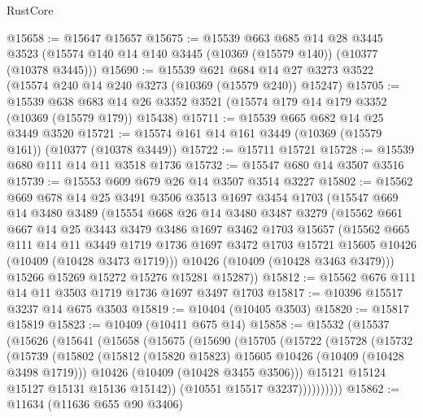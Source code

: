 \begin{lexlean}{RustCore}
\begin{coremodule}
@15658 := @15647 @15657
@15675 := @15539
    @663
    @685
    @14
    @28
    @3445
    @3523
    (@15574 @140 @14 @140 @3445 (@10369 (@15579 @140)) (@10377 (@10378 @3445)))
@15690 := @15539
    @621
    @684
    @14
    @27
    @3273
    @3522
    (@15574 @240 @14 @240 @3273 (@10369 (@15579 @240)) @15247)
@15705 := @15539
    @638
    @683
    @14
    @26
    @3352
    @3521
    (@15574 @179 @14 @179 @3352 (@10369 (@15579 @179)) @15438)
@15711 := @15539 @665 @682 @14 @25 @3449 @3520
@15721 := @15574 @161 @14 @161 @3449 (@10369 (@15579 @161)) (@10377 (@10378 @3449))
@15722 := @15711 @15721
@15728 := @15539 @680 @111 @14 @11 @3518 @1736
@15732 := @15547 @680 @14 @3507 @3516
@15739 := @15553 @609 @679 @26 @14 @3507 @3514 @3227
@15802 := @15562
    @669
    @678
    @14
    @25
    @3491
    @3506
    @3513
    @1697
    @3454
    @1703
    (@15547
      @669
      @14
      @3480
      @3489
      (@15554
        @668
        @26
        @14
        @3480
        @3487
        @3279
        (@15562
          @661
          @667
          @14
          @25
          @3443
          @3479
          @3486
          @1697
          @3462
          @1703
          @15657
          (@15562
            @665
            @111
            @14
            @11
            @3449
            @1719
            @1736
            @1697
            @3472
            @1703
            @15721
            @15605
            @10426
            (@10409 (@10428 @3473 @1719)))
          @10426
          (@10409 (@10428 @3463 @3479)))
        @15266
        @15269
        @15272
        @15276
        @15281
        @15287))
@15812 := @15562 @676 @111 @14 @11 @3503 @1719 @1736 @1697 @3497 @1703
@15817 := @10396 @15517 @3237 @14 @675 @3503
@15819 := @10404 (@10405 @3503)
@15820 := @15817 @15819
@15823 := @10409 (@10411 @675 @14)
@15858 := @15532
    (@15537
      (@15626
        (@15641
          (@15658
            (@15675
              (@15690
                (@15705
                  (@15722
                    (@15728
                      (@15732
                        (@15739
                          (@15802
                            (@15812 (@15820 @15823) @15605 @10426 (@10409 (@10428 @3498 @1719)))
                            @10426
                            (@10409 (@10428 @3455 @3506)))
                          @15121
                          @15124
                          @15127
                          @15131
                          @15136
                          @15142))
                      (@10551 @15517 @3237))))))))))
@15862 := @11634 (@11636 @655 @90 @3406)

\end{coremodule}
\end{lexlean}

